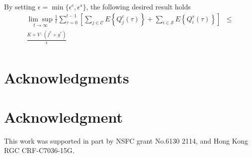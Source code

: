 \documentclass[10pt,journal,compsoc]{IEEEtran}
\begin{document}
By setting $\epsilon = \min\{ \epsilon^c, \epsilon^s \}$, the following desired result holds
\begin{equation}
	\begin{array}{rc}
		\displaystyle \underset{t \to \infty}{\lim \sup} \frac{1}{t} \sum_{\tau=0}^{t-1} \left[ \sum_{j \in \mathcal{C}} E\left\{ Q^c_j(\tau) \right\} + \sum_{i \in \mathcal{S}} E\left\{ Q^s_i(\tau) \right\} \right]
			& \le \\
			\displaystyle \frac{K + V \cdot (f^* + g^*) }{\epsilon} \\
	\end{array}
\end{equation}

\IEEEQED


\ifCLASSOPTIONcompsoc
  \section*{Acknowledgments} 
\else
  \section*{Acknowledgment}
\fi

This work was supported in part by NSFC grant No.6130 2114, and Hong Kong RGC CRF-C7036-15G.

\ifCLASSOPTIONcaptionsoff
  \newpage
\fi




\end{document}
